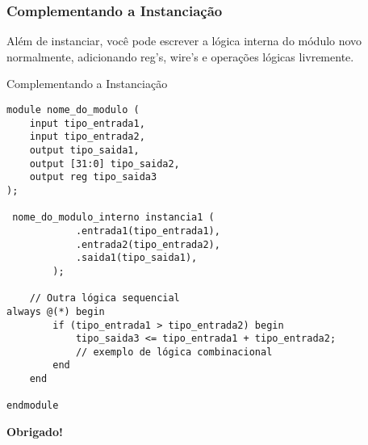 \documentclass{beamer}
\begin{document}
\begin{frame}
\frametitle{Complementando a Instanciação}

Além de instanciar, você pode escrever a lógica interna do módulo novo normalmente, adicionando reg's, wire's e operações lógicas livremente.
\end{frame}

\begin{frame}[fragile]{Complementando a Instanciação}
\scriptsize
\begin{verbatim}
module nome_do_modulo ( 
    input tipo_entrada1,
    input tipo_entrada2,
    output tipo_saida1, 
    output [31:0] tipo_saida2, 
    output reg tipo_saida3 
);

 nome_do_modulo_interno instancia1 ( 
            .entrada1(tipo_entrada1), 
            .entrada2(tipo_entrada2), 
            .saida1(tipo_saida1),
        );

    // Outra lógica sequencial
always @(*) begin
        if (tipo_entrada1 > tipo_entrada2) begin
            tipo_saida3 <= tipo_entrada1 + tipo_entrada2; 
            // exemplo de lógica combinacional
        end
    end

endmodule
\end{verbatim}
\end{frame}

\begin{frame}[plain]
    \centering
    {\Huge \textbf{Obrigado!}}
\end{frame}
\end{document}
